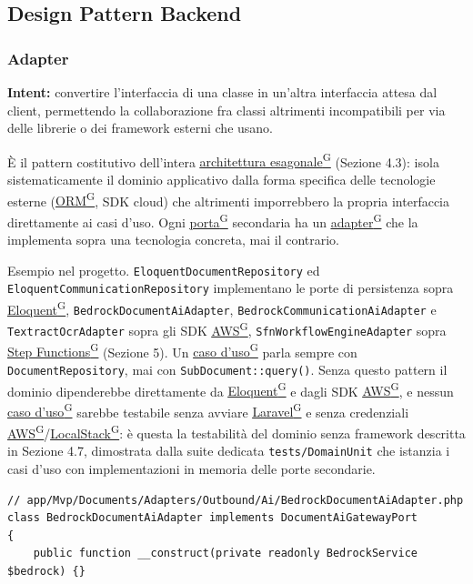 \documentclass[a4paper,12pt]{article}
\providecommand{\glslink}[2]{\href{https://alittlebyte-19.github.io/Documentazione/glossario.html\#gls-#1}{\underline{#2}\textsuperscript{\scriptsize G}}}
\begin{document}
\begin{sloppypar}
\subsection{Design Pattern Backend}

\subsubsection{Adapter}

\textbf{Intent:} convertire l'interfaccia di una classe in un'altra interfaccia attesa dal client, permettendo la collaborazione fra classi altrimenti incompatibili per via delle librerie o dei framework esterni che usano.

È il pattern costitutivo dell'intera \glslink{architettura-esagonale}{architettura esagonale} (Sezione 4.3): isola sistematicamente il dominio applicativo dalla forma specifica delle tecnologie esterne (\glslink{orm-object-relational-mapping}{ORM}, SDK cloud) che altrimenti imporrebbero la propria interfaccia direttamente ai casi d'uso. Ogni \glslink{porta}{porta} secondaria ha un \glslink{adapter}{adapter} che la implementa sopra una tecnologia concreta, mai il contrario.

Esempio nel progetto. \texttt{EloquentDocumentRepository} ed \texttt{EloquentCommunicationRepository} implementano le porte di persistenza sopra \glslink{eloquent}{Eloquent}, \texttt{BedrockDocumentAiAdapter}, \texttt{BedrockCommunicationAiAdapter} e \texttt{TextractOcrAdapter} sopra gli SDK \glslink{aws}{AWS}, \texttt{SfnWorkflowEngineAdapter} sopra \glslink{step-functions}{Step Functions} (Sezione 5). Un \glslink{caso-d-uso-uc}{caso d'uso} parla sempre con \texttt{DocumentRepository}, mai con \texttt{SubDocument::query()}. Senza questo pattern il dominio dipenderebbe direttamente da \glslink{eloquent}{Eloquent} e dagli SDK \glslink{aws}{AWS}, e nessun \glslink{caso-d-uso-uc}{caso d'uso} sarebbe testabile senza avviare \glslink{laravel}{Laravel} e senza credenziali \glslink{aws}{AWS}/\glslink{localstack}{LocalStack}: è questa la testabilità del dominio senza framework descritta in Sezione 4.7, dimostrata dalla suite dedicata \texttt{tests/DomainUnit} che istanzia i casi d'uso con implementazioni in memoria delle porte secondarie.

\begin{lstlisting}[style=phplisting, caption={BedrockDocumentAiAdapter -- adapter secondario sopra BedrockService}]
// app/Mvp/Documents/Adapters/Outbound/Ai/BedrockDocumentAiAdapter.php
class BedrockDocumentAiAdapter implements DocumentAiGatewayPort
{
    public function __construct(private readonly BedrockService $bedrock) {}


\end{lstlisting}
\end{sloppypar}
\end{document}
